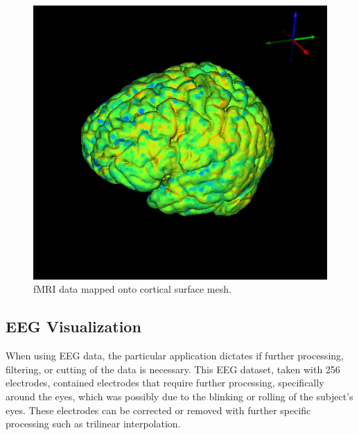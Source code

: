 \begin{figure}[H]
\begin{center}
\includegraphics[width=.75\textwidth]{Figures/fmri_1}
\caption{fMRI data mapped onto cortical surface mesh.}
\label{fig:fmrivis}
\end{center}
\end{figure}

\subsection{EEG Visualization}

When using EEG data, the particular application dictates if further processing, filtering, or cutting of the data is necessary. This EEG dataset, taken with 256 electrodes, contained electrodes that require further processing, specifically around the eyes, which was possibly due to the blinking or rolling of the subject's eyes. These electrodes can be corrected or removed with further specific processing such as trilinear interpolation. %


